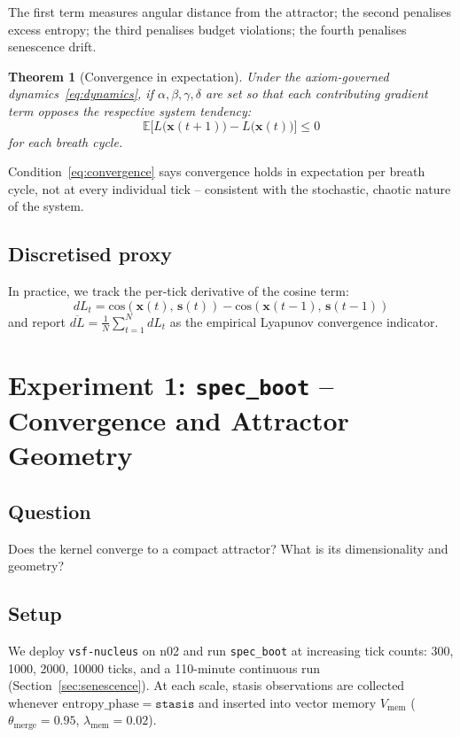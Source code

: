 \documentclass[11pt, a4paper]{article}
\newtheorem{theorem}{Theorem}
\newcommand{\E}{\mathbb{E}}
\newcommand{\stasis}{\bm{s}}
\newcommand{\sv}{\bm{x}}
\newcommand{\cosim}[2]{\mathrm{cos}\!\left(#1,\, #2\right)}
\newcommand{\nucleus}{\texttt{vsf-nucleus}}
\begin{document}
The first term measures angular distance from the attractor;
the second penalises excess entropy; the third penalises budget violations;
the fourth penalises senescence drift.

\begin{theorem}[Convergence in expectation]
\label{thm:convergence}
Under the axiom-governed dynamics~\eqref{eq:dynamics},
if $\alpha, \beta, \gamma, \delta$ are set so that each contributing
gradient term opposes the respective system tendency:
\begin{equation}
  \E\bigl[L\bigl(\sv(t+1)\bigr) - L\bigl(\sv(t)\bigr)\bigr] \le 0
\label{eq:convergence}
\end{equation}
for each breath cycle.
\end{theorem}

Condition~\eqref{eq:convergence} says convergence holds in expectation per
breath cycle, not at every individual tick -- consistent with the stochastic,
chaotic nature of the system.

\subsection*{Discretised proxy}

In practice, we track the per-tick derivative of the cosine term:
\begin{equation}
  dL_t = \cosim{\sv(t)}{\stasis(t)} - \cosim{\sv(t-1)}{\stasis(t-1)}
\end{equation}
and report $\overline{dL} = \frac{1}{N}\sum_{t=1}^{N} dL_t$
as the empirical Lyapunov convergence indicator.


\section{Experiment 1: \texttt{spec\_boot} -- Convergence and Attractor Geometry}
\label{sec:specboot}

\subsection*{Question} Does the kernel converge to a compact attractor?
What is its dimensionality and geometry?

\subsection{Setup}

We deploy \nucleus{} on n02 and run \texttt{spec\_boot} at increasing tick
counts: 300, 1000, 2000, 10000 ticks, and a 110-minute continuous run
(Section~\ref{sec:senescence}).
At each scale, stasis observations are collected whenever
$\mathrm{entropy\_phase} = \texttt{stasis}$ and inserted into vector memory
$V_\text{mem}$ ($\theta_\text{merge} = 0.95$, $\lambda_\text{mem} = 0.02$).
\end{document}
